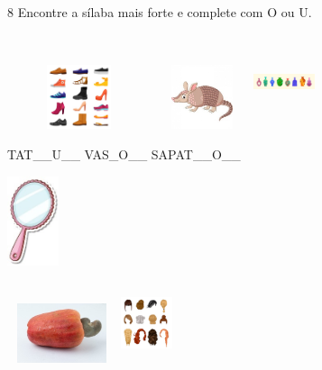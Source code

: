 \num{8} Encontre a sílaba mais forte e complete com O ou U.


\includegraphics[width=1.65486in,height=0.74499in]{media/image34.jpeg}
\includegraphics[width=1.09512in,height=0.74522in]{media/image35.jpeg}
\includegraphics[width=0.69978in,height=1.10152in]{media/image36.jpeg}

TAT\_\_U\_\_ VAS\_O\_\_ SAPAT\_\_O\_\_

\includegraphics[width=0.59861in,height=1.03542in]{media/image37.jpeg}

\includegraphics[width=1.26250in,height=0.68750in]{media/image38.jpeg}
\includegraphics[width=0.59873in,height=0.93296in]{media/image39.jpeg}


